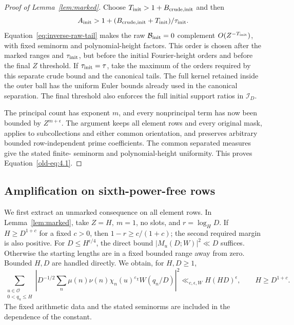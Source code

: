 \documentclass[11pt,a4paper]{article}
\numberwithin{equation}{section}
\numberwithin{figure}{section}
\theoremstyle{definition}
\theoremstyle{remark}
\begin{document}
\begin{proof}[Proof of Lemma~\ref{lem:marked}]
Choose \(T_{\rm init}>1+B_{\rm crude,init}\) and then
\[
 A_{\rm init}>1+(B_{\rm crude,init}+T_{\rm init})/\tau_{\rm init}.
\]
Equation~\eqref{eq:inverse-raw-tail} makes the raw
\(\mathcal B_{\rm init}=0\) complement \(O(Z^{-T_{\rm init}})\), with
fixed seminorm and polynomial-height factors.  This order is chosen after
the marked ranges and \(\tau_{\rm init}\), but before the initial
Fourier-height orders and before the final \(Z\) threshold.  If
\(\tau_{\rm init}=\tau\), take the maximum of the orders required by this
separate crude bound and the canonical tails.  The full kernel retained
inside the outer ball has the uniform Euler bounds already used in the
canonical separation.  The final threshold also enforces the full initial support
ratios in \(\mathcal I_D\).

The principal count has exponent \(m\), and every nonprincipal term has
now been bounded by \(Z^{m+\epsilon}\).  The argument keeps all element
rows and every original mask, applies to subcollections and either common
orientation, and preserves arbitrary bounded row-independent prime
coefficients.  The common separated measures give the stated finite-
seminorm and polynomial-height uniformity.  This proves
Equation~\eqref{old-eq:4.1}.
\end{proof}

\subsection{Amplification on sixth-power-free rows}

We first extract an unmarked consequence on all element rows.  In
Lemma~\ref{lem:marked}, take \(Z=H,\ m=1\), no slots, and
\(r=\log_H D\).  If \(H\ge D^{1+c}\) for a fixed \(c>0\), then
\(1-r\ge c/(1+c)\); the second required margin is also positive.
For \(D\le H^{\epsilon/4}\), the direct bound
\(|M_u(D;W)|^2\ll D\) suffices.  Otherwise the starting lengths
are in a fixed bounded range away from zero.  Bounded \(H,D\)
are handled directly.  We obtain, for \(H,D\ge1\),
\begin{equation}\label{eq:raw-moment}
 \sum_{\substack{u\in\mathcal O\\0<q_u\le H}}
 \left|D^{-1/2}\sum_n\mu(n)\nu(n)\chi_n(u)^{\varepsilon_\chi}
                         W(q_n/D)\right|^2
 \ll_{c,\epsilon,W} H(HD)^\epsilon,\qquad H\ge D^{1+c}.
\end{equation}
The fixed arithmetic data and the stated seminorms are included in
the dependence of the constant.
\end{document}

